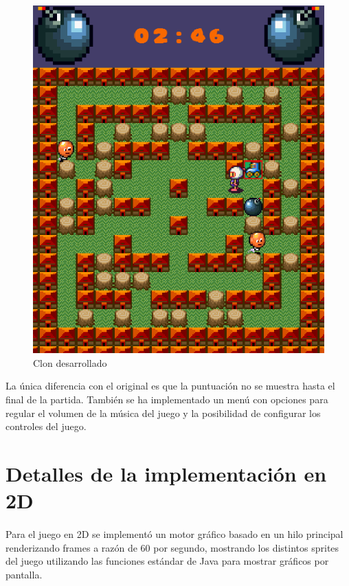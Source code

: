\documentclass[a4paper]{article}
\begin{document}
\begin{figure}[H]
\begin{minipage}[b]{0.4\textwidth}
		\includegraphics[width=\textwidth]{bomberman.png}
		\caption{Clon desarrollado}
	\end{minipage}
	\label{fig:primerBomberman}
\end{figure}
La única diferencia con el original es que la puntuación no se muestra hasta el final de la partida. También se ha implementado un menú con opciones para regular el volumen de la música del juego y la posibilidad de configurar los controles del juego.
\newpage
\section{Detalles de la implementación en 2D}
\paragraph{}Para el juego en 2D se implementó un motor gráfico basado en un hilo principal renderizando frames a razón de 60 por segundo, mostrando los distintos sprites del juego utilizando las funciones estándar de Java para mostrar gráficos por pantalla.
\end{document}
